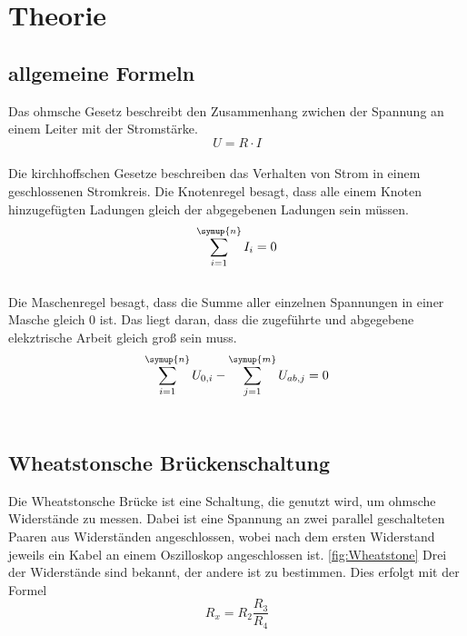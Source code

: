 \section{Theorie}
\label{sec:Theorie}
    \subsection{allgemeine Formeln}
    Das ohmsche Gesetz beschreibt den Zusammenhang zwichen der Spannung an einem Leiter mit der Stromstärke.
    \begin{equation}
        U=R \cdot I
        \label{eqn:ohm}
    \end{equation}\\
    Die kirchhoffschen Gesetze beschreiben das Verhalten von Strom in einem geschlossenen Stromkreis.
    Die Knotenregel besagt, dass alle einem Knoten hinzugefügten Ladungen gleich der abgegebenen Ladungen sein müssen.
    \begin{equation}
        \sum_{i=1}^{\symup{n}}{I_i}=0
        \label{eqn:knoten}
    \end{equation}\\
    Die Maschenregel besagt, dass die Summe aller einzelnen Spannungen in einer Masche gleich 0 ist. 
    Das liegt daran, dass die zugeführte und abgegebene elekztrische Arbeit gleich groß sein muss.
    \begin{equation}
        \sum_{i=1}^{\symup{n}}{U_{0,i}} - \sum_{j=1}^{\symup{m}}{U_{ab,j}} =0
        \label{eqn:masche}
    \end{equation}\\

    \subsection{Wheatstonsche Brückenschaltung}
    Die Wheatstonsche Brücke ist eine Schaltung, die genutzt wird, um ohmsche Widerstände zu messen.
    Dabei ist eine Spannung an zwei parallel geschalteten Paaren aus Widerständen angeschlossen, wobei nach dem ersten Widerstand jeweils ein Kabel an einem Oszilloskop angeschlossen ist.
    \ref{fig:Wheatstone}
    Drei der Widerstände sind bekannt, der andere ist zu bestimmen.
    Dies erfolgt mit der Formel
    \begin{equation}
        R_x=R_2 \frac{R_3}{R_4}
        \label{eqn:widerstand}
    \end{equation}

